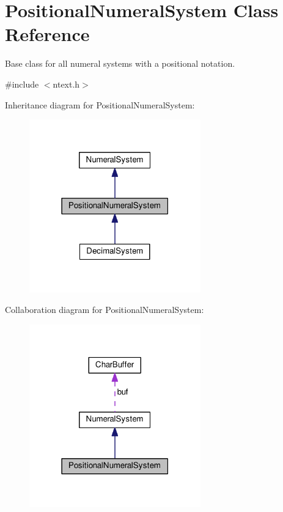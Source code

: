 \hypertarget{classPositionalNumeralSystem}{}\section{Positional\+Numeral\+System Class Reference}
\label{classPositionalNumeralSystem}


Base class for all numeral systems with a positional notation.  




{\ttfamily \#include $<$ntext.\+h$>$}



Inheritance diagram for Positional\+Numeral\+System\+:\nopagebreak
\begin{figure}[H]
\begin{center}
\leavevmode
\includegraphics[width=210pt]{classPositionalNumeralSystem__inherit__graph}
\end{center}
\end{figure}


Collaboration diagram for Positional\+Numeral\+System\+:\nopagebreak
\begin{figure}[H]
\begin{center}
\leavevmode
\includegraphics[width=210pt]{classPositionalNumeralSystem__coll__graph}
\end{center}
\end{figure}
